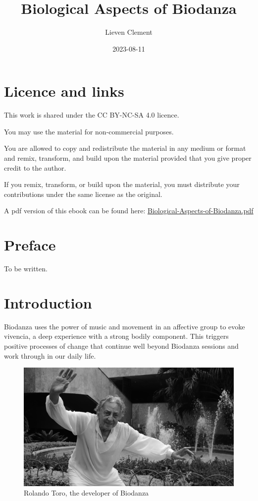 \documentclass[
  11pt,
]{book}
\title{Biological Aspects of Biodanza}
\author{Lieven Clement}
\date{2023-08-11}
\begin{document}
\maketitle

{
\hypersetup{linkcolor=}
\setcounter{tocdepth}{2}
\tableofcontents
}
\hypertarget{licence-and-links}{%
\chapter*{Licence and links}\label{licence-and-links}}

This work is shared under the CC BY-NC-SA 4.0 licence.

You may use the material for non-commercial purposes.

You are allowed to copy and redistribute the material in any medium or format and remix, transform, and build upon the material provided that you give proper credit to the author.

If you remix, transform, or build upon the material, you must distribute your contributions under the same license as the original.

A pdf version of this ebook can be found here: \href{https://biodanzabrugge.be/biologicalAspectsBiodanza/Biological-Aspects-of-Biodanza.pdf}{Biological-Aspects-of-Biodanza.pdf}

\hypertarget{preface}{%
\chapter*{Preface}\label{preface}}

To be written.

\hypertarget{intro}{%
\chapter{Introduction}\label{intro}}

Biodanza uses the power of music and movement in an affective group to evoke vivencia, a deep experience with a strong bodily component. This triggers positive processes of change that continue well beyond Biodanza sessions and work through in our daily life.

\begin{figure}

{\centering \includegraphics[width=0.45\linewidth]{./figs/rolando} 

}

\caption{Rolando Toro, the developer of Biodanza}\label{fig:rolandoToro}
\end{figure}
\end{document}
